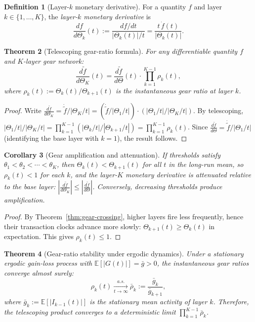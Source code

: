 \documentclass[twocolumn,11pt,a4paper]{article}
\theoremstyle{thmstyle}
\newtheorem{theorem}{Theorem}[section]
\newtheorem{corollary}[theorem]{Corollary}
\theoremstyle{definition}
\newtheorem{definition}[theorem]{Definition}
\theoremstyle{remark}
\newcommand{\Gain}{G}                        %
\newcommand{\Clock}{\Theta}                  %
\newcommand{\Mdiff}[1]{\frac{d#1}{d\Clock}} %
\newcommand{\MdiffK}[2]{\frac{d#1}{d\Clock_{#2}}} %
\newcommand{\Expect}{\mathbb{E}}
\begin{document}
\begin{definition}[Layer-$k$ monetary derivative]
\label{def:layered-mderiv}
For a quantity $f$ and layer $k\in\{1,\ldots,K\}$, the
\emph{layer-$k$ monetary derivative} is
\begin{equation}
  \MdiffK{f}{k}(t)
  := \frac{df/dt}{|\Clock_{k}(t)|/t}
  = \frac{t\,\dot{f}(t)}{|\Clock_{k}(t)|}.
\end{equation}
\end{definition}

\begin{theorem}[Telescoping gear-ratio formula]
\label{thm:telescope}
For any differentiable quantity $f$ and $K$-layer gear
network:
\begin{equation}\label{eq:telescope}
  \MdiffK{\tilde{f}}{K}(t)
  = \Mdiff{\tilde{f}}(t)
    \cdot \prod_{k=1}^{K-1} \rho_{k}(t),
\end{equation}
where $\rho_{k}(t) := \Clock_{k}(t)/\Clock_{k+1}(t)$
is the \emph{instantaneous gear ratio} at layer $k$.
\end{theorem}

\begin{proof}
Write $\MdiffK{\tilde{f}}{K} = \dot{\tilde{f}}/|\Clock_{K}/t|
= (\dot{\tilde{f}}/|\Clock_{1}/t|)\cdot
(|\Clock_{1}/t|/|\Clock_{K}/t|)$.
By telescoping,
$|\Clock_{1}/t|/|\Clock_{K}/t|
= \prod_{k=1}^{K-1}(|\Clock_{k}/t|/|\Clock_{k+1}/t|)
= \prod_{k=1}^{K-1}\rho_{k}(t)$.
Since $\Mdiff{\tilde{f}} = \dot{\tilde{f}}/|\Clock_{1}/t|$
(identifying the base layer with $k=1$), the result follows.
\end{proof}

\begin{corollary}[Gear amplification and attenuation]
\label{cor:gear-amp}
If thresholds satisfy $\theta_{1}<\theta_{2}<\cdots<\theta_{K}$,
then $\Clock_{k}(t)<\Clock_{k+1}(t)$ for all $t$ in the
long-run mean, so $\rho_{k}(t)<1$ for each $k$, and the
layer-$K$ monetary derivative is \emph{attenuated}
relative to the base layer:
$|\MdiffK{\tilde{f}}{K}| \leq |\Mdiff{\tilde{f}}|$.
Conversely, decreasing thresholds produce amplification.
\end{corollary}

\begin{proof}
By Theorem~\ref{thm:gear-crossing}, higher layers fire
less frequently, hence their transaction clocks advance
more slowly: $\Clock_{k+1}(t)\geq\Clock_{k}(t)$ in
expectation.  This gives $\rho_{k}(t)\leq 1$.
\end{proof}

\begin{theorem}[Gear-ratio stability under ergodic dynamics]
\label{thm:gear-stability}
Under a stationary ergodic gain-loss process with
$\Expect[|\Gain(t)|]=\bar{g}>0$, the instantaneous gear
ratios converge almost surely:
\begin{equation}
  \rho_{k}(t) \xrightarrow[t\to\infty]{a.s.}
  \bar{\rho}_{k} := \frac{\bar{g}_{k}}{\bar{g}_{k+1}},
\end{equation}
where $\bar{g}_{k} := \Expect[|I_{k-1}(t)|]$ is the
stationary mean activity of layer $k$.  Therefore,
the telescoping product converges to a deterministic limit
$\prod_{k=1}^{K-1}\bar{\rho}_{k}$.
\end{theorem}
\end{document}
